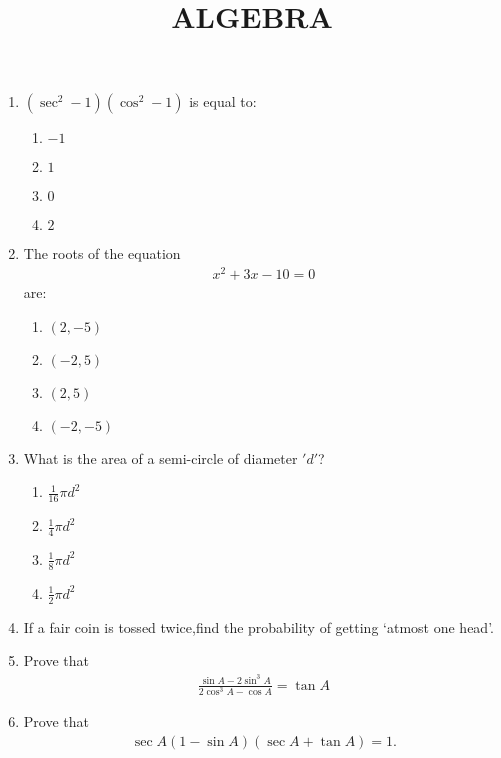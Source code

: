 \documentclass{article}
\providecommand{\brak}[1]{\ensuremath{\left(#1\right)}}
\begin{document}
\begin{center}
\title{ALGEBRA}
\date{}
\maketitle
\end{center}
\begin{enumerate}
    \item $\brak{\sec^2-1}\brak{\cos^2-1}$ is equal to:
    \begin{enumerate}
    \item $-1$
    \item $1$
    \item $0$
    \item $2$
    \end{enumerate}

    \item The roots of the equation 
    \begin{align}
        x^2+3x-10=0
    \end{align}
    are:
    \begin{enumerate}
        \item $\brak{2,-5}$ \item $\brak{-2,5}$ \item $\brak{2,5}$  \item $\brak{-2,-5}$
    \end{enumerate}

    \item What is the area of a semi-circle of diameter $'d'$?
    
    \begin{enumerate}
        \item $\frac{1}{16}\pi d^2$ \item $\frac{1}{4}\pi d^2$ \item $\frac{1}{8}\pi d^2$ \item $\frac{1}{2}\pi d^2$
    \end{enumerate}


    \item If a fair coin is tossed twice,find the probability of getting `atmost one head'.

     \item Prove that 
    \begin{align}
        \frac{\sin A-2\sin^3 A}{2 \cos^3 A-\cos A}=\tan A
    \end{align}

    \item Prove that 
    \begin{align}
        \sec A\brak{1-\sin A}\brak{\sec A+\tan A}=1.
    \end{align}


\end{enumerate}
\end{document}
